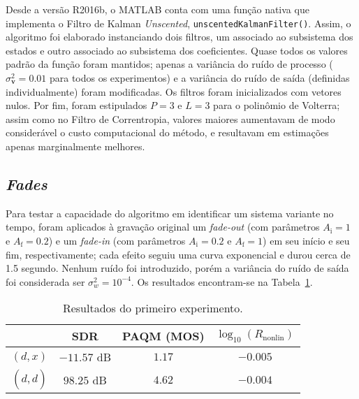 Desde a versão R2016b, o MATLAB conta com uma função nativa que implementa o Filtro de
Kalman \textit{Unscented}, \texttt{unscentedKalmanFilter()}. Assim, o algoritmo foi
elaborado instanciando dois filtros, um associado ao subsistema dos estados e outro
associado ao subsistema dos coeficientes. Quase todos os valores padrão da função foram
mantidos; apenas a variância do ruído de processo ($\sigma_{\mathbf{v}}^2 =
	0.01$ para todos os
experimentos) e a variância do ruído de saída (definidas individualmente) foram
modificadas. Os filtros foram inicializados com vetores nulos. Por fim, foram
estipulados $P=3$ e $L=3$ para o polinômio de Volterra; assim como no Filtro de
Correntropia, valores maiores aumentavam de modo considerável o custo computacional do
método, e resultavam em estimações apenas marginalmente melhores.

\subsection{\textit{Fades}}

Para testar a capacidade do algoritmo em identificar um sistema variante no tempo,
foram aplicados à gravação original um \textit{fade-out} (com parâmetros $A_\text{i} =
1$ e $A_\text{f} = 0.2$) e um \textit{fade-in} (com parâmetros $A_\text{i} = 0.2$ e
$A_\text{f} = 1$) em seu início e seu fim, respectivamente; cada efeito seguiu uma
curva exponencial e durou cerca de 1.5 segundo. Nenhum ruído foi introduzido, porém a
variância do ruído de saída foi considerada ser $\sigma_w^2 =
	10^{-4}$. Os resultados
encontram-se na Tabela~\ref{tab:unscented:experiment-1}.
{\def\arraystretch{1.25}\tabcolsep=10pt
\begin{table}[!ht]
	\centering
	\caption[Resultados do primeiro experimento: \textit{fades}]{Resultados do primeiro experimento.}
	\label{tab:unscented:experiment-1}
	\begin{tabular}{cccc}
		\toprule
		               & SDR         & PAQM (MOS) & $\log_{10}(R_{\text{nonlin}})$ \\
		\midrule
		$(d, x)$       & $-11.57$ dB & $1.17$     & $-0.005$                       \\
		$(d, \hat{d})$ & $98.25$ dB  & $4.62$     & $-0.004$                       \\ \bottomrule
	\end{tabular}
\end{table}
}

